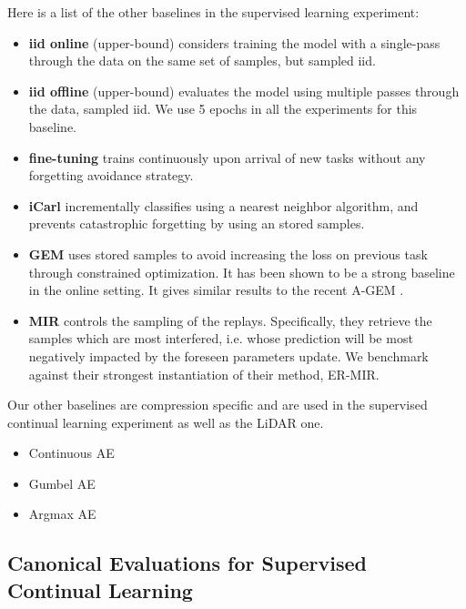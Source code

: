 \documentclass[colorinlistoftodos]{article} %
\begin{document}
Here is a list of the other baselines in the supervised learning experiment:
\begin{itemize}
    \item \textbf{iid online} (upper-bound)
    considers training the model with a single-pass through the data on the same set of samples, but sampled iid.
    \item \textbf{iid offline} (upper-bound)
    evaluates the model using multiple passes through the data, sampled iid. We use 5 epochs in all the experiments for this baseline.
    \item \textbf{fine-tuning} trains continuously upon arrival of new tasks without any forgetting avoidance strategy.
    \item \textbf{iCarl} \citep{rebuffi2017icarl} incrementally classifies using a nearest neighbor algorithm, and prevents catastrophic forgetting by using an stored samples.
    \item \textbf{GEM} \citep{lopez2017gradient} uses stored samples to avoid increasing the loss on previous task through constrained optimization. It has been shown to be a strong baseline in the online setting. It gives similar results to the recent A-GEM \cite{chaudhry2018efficient}.
    \item  \textbf{MIR} \citep{aljundi2019online} controls the sampling of the replays. Specifically, they retrieve the samples which are most interfered, i.e. whose prediction will be most negatively impacted by the foreseen parameters update. We benchmark against their strongest instantiation of their method, ER-MIR.
\end{itemize}

Our other baselines are compression specific and are used in the supervised continual learning experiment as well as the LiDAR one. 


\begin{itemize}
    \item Continuous AE
    \item Gumbel AE
    \item Argmax AE
\end{itemize}



\subsection{Canonical Evaluations for Supervised Continual Learning}
\label{sec:can_cl}
\end{document}
